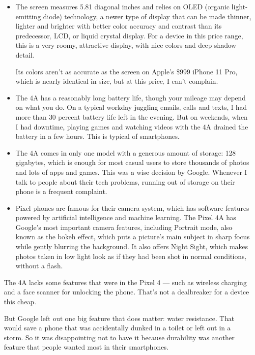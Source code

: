 \begin{itemize}
\item
  The screen measures 5.81 diagonal inches and relies on OLED (organic
  light-emitting diode) technology, a newer type of display that can be
  made thinner, lighter and brighter with better color accuracy and
  contrast than its predecessor, LCD, or liquid crystal display. For a
  device in this price range, this is a very roomy, attractive display,
  with nice colors and deep shadow detail.

  Its colors aren't as accurate as the screen on Apple's \$999 iPhone 11
  Pro, which is nearly identical in size, but at this price, I can't
  complain.
\item
  The 4A has a reasonably long battery life, though your mileage may
  depend on what you do. On a typical workday juggling emails, calls and
  texts, I had more than 30 percent battery life left in the evening.
  But on weekends, when I had downtime, playing games and watching
  videos with the 4A drained the battery in a few hours. This is typical
  of smartphones.
\item
  The 4A comes in only one model with a generous amount of storage: 128
  gigabytes, which is enough for most casual users to store thousands of
  photos and lots of apps and games. This was a wise decision by Google.
  Whenever I talk to people about their tech problems, running out of
  storage on their phone is a frequent complaint.
\item
  Pixel phones are famous for their camera system, which has software
  features powered by artificial intelligence and machine learning. The
  Pixel 4A has Google's most important camera features, including
  Portrait mode, also known as the bokeh effect, which puts a picture's
  main subject in sharp focus while gently blurring the background. It
  also offers Night Sight, which makes photos taken in low light look as
  if they had been shot in normal conditions, without a flash.
\end{itemize}

The 4A lacks some features that were in the Pixel 4 --- such as wireless
charging and a face scanner for unlocking the phone. That's not a
dealbreaker for a device this cheap.

But Google left out one big feature that does matter: water resistance.
That would save a phone that was accidentally dunked in a toilet or left
out in a storm. So it was disappointing not to have it because
durability was another feature that people wanted most in their
smartphones.

